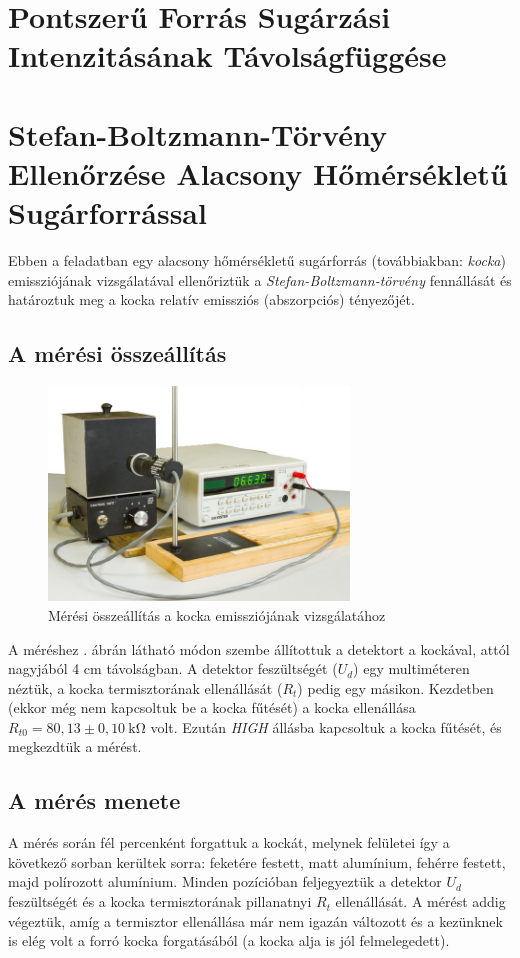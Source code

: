 \documentclass[a4paper, 12pt]{article}
\begin{document}
    \section[Intenzitás Távolságfüggése]{Pontszerű Forrás Sugárzási Intenzitásának Távolságfüggése}
    
    \section[Alacsony Hőmérsékletű Sugárforrás]{Stefan-Boltzmann-Törvény Ellenőrzése Alacsony Hőmérsékletű Sugárforrással}
    Ebben a feladatban egy alacsony hőmérsékletű sugárforrás (továbbiakban: \textit{kocka}) emissziójának vizsgálatával ellenőriztük a \textit{Stefan-Boltzmann-törvény} fennállását és határoztuk meg a kocka relatív emissziós (abszorpciós) tényezőjét.

    \subsection{A mérési összeállítás}
    \begin{figure}[H]
        \centering
        \includegraphics[width=8cm]{632px-Homsug5}
        \caption{Mérési összeállítás a kocka emissziójának vizsgálatához}
        \label{fig:4ossze}
    \end{figure}

    A méréshez . ábrán látható módon szembe állítottuk a detektort a kockával, attól nagyjából 4 cm távolságban.
    A detektor feszültségét ($U_d$) egy multiméteren néztük, a kocka termisztorának ellenállását ($R_t$) pedig egy másikon.
    Kezdetben (ekkor még nem kapcsoltuk be a kocka fűtését) a kocka ellenállása $R_{t0}=80,13\pm 0,10~\mathrm{k\Omega}$ volt.
    Ezután \textit{HIGH} állásba kapcsoltuk a kocka fűtését, és megkezdtük a mérést.

    \subsection{A mérés menete}
    A mérés során fél percenként forgattuk a kockát, melynek felületei így a következő sorban kerültek sorra: feketére festett, matt alumínium, fehérre festett, majd polírozott alumínium.
    Minden pozícióban feljegyeztük a detektor $U_d$ feszültségét és a kocka termisztorának pillanatnyi $R_t$ ellenállását.
    A mérést addig végeztük, amíg a termisztor ellenállása már nem igazán változott és a kezünknek is elég volt a forró kocka forgatásából (a kocka alja is jól felmelegedett).
\end{document}
